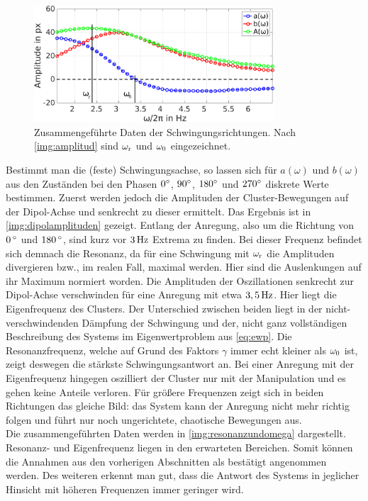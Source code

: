           \begin{figure}[!b]
            \centering
            \includegraphics[width=0.8\textwidth,height=0.4\textwidth]{figs/auswertung/phasen/dipolphasenaufg.png}
            \caption{Zusammengeführte Daten der Schwingungsrichtungen. Nach \autoref{img:amplitud} sind $\omega_\text{r}$ und $\omega_\text{0}$ eingezeichnet.}\label{img:resonanzundomega}
          \end{figure}

          Bestimmt man die (feste) Schwingungsachse, so lassen sich für $a\left(\omega\right)$ und $b\left(\omega\right)$ aus den Zuständen bei den Phasen $0^\circ$, $90^\circ$, $180^\circ$ und $270^\circ$ diskrete Werte bestimmen. Zuerst werden jedoch die Amplituden der Cluster-Bewegungen auf der Dipol-Achse und senkrecht zu dieser ermittelt. Das Ergebnis ist in \autoref{img:dipolamplituden} gezeigt. Entlang der Anregung, also um die Richtung von $\unit[0]{\degree}$ und $\unit[180]{\degree}$, sind kurz vor $\unit[3]{Hz}$ Extrema zu finden. Bei dieser Frequenz befindet sich demnach die Resonanz, da für eine Schwingung mit $\omega_\text{r}$ die Amplituden divergieren bzw., im realen Fall, maximal werden. Hier sind die Auslenkungen auf ihr Maximum normiert worden. Die Amplituden der Oszillationen senkrecht zur Dipol-Achse verschwinden für eine Anregung mit etwa $\unit[3,5]{Hz}$. Hier liegt die Eigenfrequenz des Clusters. Der Unterschied zwischen beiden liegt in der nicht-verschwindenden Dämpfung der Schwingung und der, nicht ganz vollständigen Beschreibung des Systems im Eigenwertproblem aus \autoref{eq:ewp}. Die Resonanzfrequenz, welche auf Grund des Faktors $\gamma$ immer echt kleiner als $\omega_\text{0}$ ist, zeigt deswegen die stärkste Schwingungsantwort an. Bei einer Anregung mit der Eigenfrequenz hingegen oszilliert der Cluster nur mit der Manipulation und es gehen keine Anteile verloren. Für größere Frequenzen zeigt sich in beiden Richtungen das gleiche Bild: das System kann der Anregung nicht mehr richtig folgen und führt nur noch ungerichtete, chaotische Bewegungen aus.\\
          Die zusammengeführten Daten werden in \autoref{img:resonanzundomega} dargestellt. Resonanz- und Eigenfrequenz liegen in den erwarteten Bereichen. Somit können die Annahmen aus den vorherigen Abschnitten als bestätigt angenommen werden. Des weiteren erkennt man gut, dass die Antwort des Systems in jeglicher Hinsicht mit höheren Frequenzen immer geringer wird.

